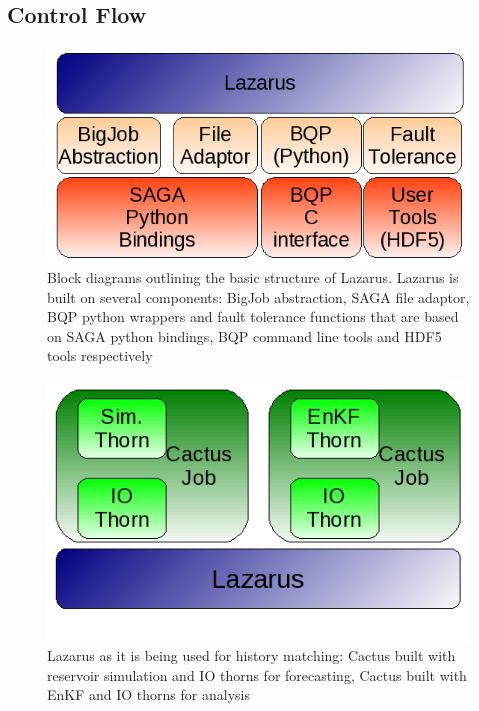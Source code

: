 \documentclass[conference,final]{IEEEtran}
\begin{document}
\subsection{Control Flow}

\begin{figure}
\begin{center}
\includegraphics[scale=0.5]{./figures/Architecture.png}
\caption{Block diagrams outlining the basic structure of Lazarus. Lazarus is built on
several components: BigJob abstraction, SAGA file adaptor, BQP python wrappers and fault tolerance
functions that are based on SAGA python bindings, BQP command line tools and HDF5 tools respectively
}
\end{center}

\label{fig:application_architecture}
\end{figure}


\begin{figure}
\begin{center}
\includegraphics[scale=0.5]{./figures/Simulations.png}
\caption{Lazarus as it is being used for history matching: Cactus
built with reservoir  simulation and IO thorns for forecasting, Cactus
built with EnKF and IO thorns for analysis
}
\end{center}

\label{fig:application_usage}
\end{figure}
\end{document}
